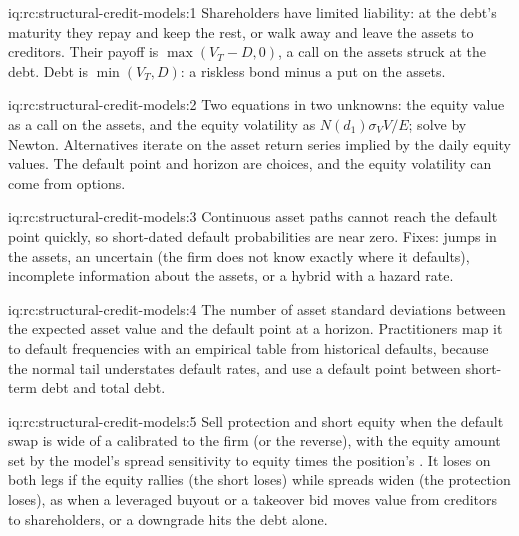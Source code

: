 \begin{solution}{iq:rc:structural-credit-models:1}
Shareholders have limited liability: at the debt's maturity they repay and keep the rest,
or walk away and leave the assets to creditors. Their payoff is $\max(V_T-D,0)$, a call on
the assets struck at the debt. Debt is $\min(V_T,D)$: a riskless bond minus a put on the
assets.
\end{solution}

\begin{solution}{iq:rc:structural-credit-models:2}
Two equations in two unknowns: the equity value as a call on the assets, and the equity
volatility as $N(d_1)\sigma_VV/E$; solve by Newton. Alternatives iterate on the asset return
series implied by the daily equity values. The default point and horizon are choices, and
the equity volatility can come from options.
\end{solution}

\begin{solution}{iq:rc:structural-credit-models:3}
Continuous asset paths cannot reach the default point quickly, so short-dated default
probabilities are near zero. Fixes: jumps in the assets, an uncertain 
(the firm does not know exactly where it defaults), incomplete information about the
assets, or a hybrid with a hazard rate.
\end{solution}

\begin{solution}{iq:rc:structural-credit-models:4}
The number of asset standard deviations between the expected asset value and the default
point at a horizon. Practitioners map it to default frequencies with an empirical table
from historical defaults, because the normal tail understates default rates, and use a
default point between short-term debt and total debt.
\end{solution}

\begin{solution}{iq:rc:structural-credit-models:5}
Sell protection and short equity when the default swap is wide of a 
calibrated to the firm (or the reverse), with the equity amount set by the model's
spread sensitivity to equity times the position's . It loses on both legs if the
equity rallies (the short loses) while spreads widen (the protection loses), as when a
leveraged buyout or a takeover bid moves value from creditors to shareholders, or a
downgrade hits the debt alone.
\end{solution}


